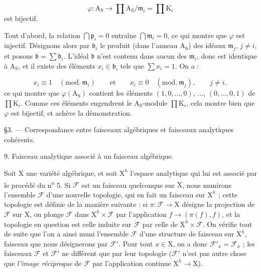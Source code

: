 \begin{equation*}
\varphi : \mathrm{A}_\mathrm{S} \to \prod \mathrm{A}_\mathrm{S}/\mathfrak{m}_i = \prod \mathrm{K}_i
\end{equation*}
est bijectif.

Tout d'abord, la relation $\bigcap \mathfrak{p}_i = 0$ entraîne $\bigcap \mathfrak{m}_i = 0$, ce qui montre que $\varphi$ est injectif. Désignons alors par $\mathfrak{b}_i$ le produit (dans l'anneau $\mathrm{A}_\mathrm{S}$) des idéaux $\mathfrak{m}_j$, $j \neq i$, et posons $\mathfrak{b} = \sum \mathfrak{b}_i$. L'idéal $\mathfrak{b}$ n'est contenu dans aucun des $\mathfrak{m}_i$, donc est identique à $\mathrm{A}_\mathrm{S}$, et il existe des éléments $x_i \in \mathfrak{b}_i$ tels que $\sum x_i = 1$. On a :

\begin{equation*}
x_i \equiv 1 \quad (\mathrm{mod.}\ \mathfrak{m}_i) \qquad \mbox{et} \qquad x_i \equiv 0 \quad (\mathrm{mod.}\ \mathfrak{m}_j), \qquad j \neq i,
\end{equation*}
ce qui montre que $\varphi(\mathrm{A}_\mathrm{S})$ contient les éléments $(1, 0, \ldots, 0)$, $\ldots$, $(0, \ldots, 0, 1)$ de $\prod \mathrm{K}_i$. Comme ces éléments engendrent le $\mathrm{A}_\mathrm{S}$-module $\prod \mathrm{K}_i$, cela montre bien que $\varphi$ est bijectif, et achève la démonstration.




\S 3. --- Correspondance entre faisceaux algébriques et faisceaux analytiques cohérents.


9. Faisceau analytique associé à un faisceau algébrique.

Soit $\mathrm{X}$ une variété algébrique, et soit $\mathrm{X}^h$ l'espace analytique qui lui est associé par le procédé du n\textsuperscript{o} 5. Si $\mathcal{F}$ est un faisceau quelconque sur $\mathrm{X}$, nous munirons l'ensemble $\mathcal{F}$ d'une nouvelle topologie, qui en fait un faisceau sur $\mathrm{X}^h$ ; cette topologie est définie de la manière suivante : si $\pi : \mathcal{F} \to \mathrm{X}$ désigne la projection de $\mathcal{F}$ sur $\mathrm{X}$, on plonge $\mathcal{F}$ dans $\mathrm{X}^h \times \mathcal{F}$ par l'application $f \to (\pi(f), f)$, et la topologie en question est celle induite sur $\mathcal{F}$ par celle de $\mathrm{X}^h \times \mathcal{F}$. On vérifie tout de suite que l'on a ainsi muni l'ensemble $\mathcal{F}$ d'une structure de faisceau sur $\mathrm{X}^h$, faisceau que nous désignerons par $\mathcal{F}'$. Pour tout $x \in \mathrm{X}$, on a donc $\mathcal{F}'_x = \mathcal{F}_x$ ; les faisceaux $\mathcal{F}$ et $\mathcal{F}'$ ne diffèrent que par leur topologie ($\mathcal{F}'$ n'est pas autre chose que \emph{l'image réciproque} de $\mathcal{F}$ par l'application continue $\mathrm{X}^h \to \mathrm{X}$).

